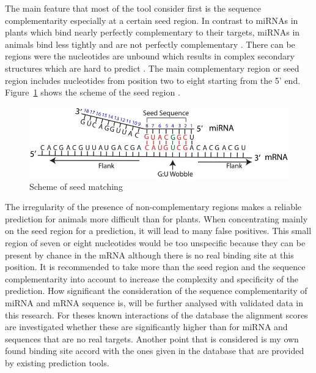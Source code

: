 \documentclass[12pt,  a4paper]{report}
\begin{document}
The main feature that most of the tool consider first is the sequence complementarity especially at a certain seed region. In contrast to miRNAs in plants which bind nearly perfectly complementary to their targets, miRNAs in animals bind less tightly and are not perfectly complementary \cite{Rhoades}. There can be regions were the nucleotides are unbound which results in complex secondary structures which are hard to predict \cite{Rehmsmeier}. The main complementary region or seed region includes nucleotides from position two to eight starting from the 5' end. Figure~\ref{seed} shows the scheme of the seed region \cite{Peterson}. \\


\begin{figure}[h]
\centering
\includegraphics[scale=2.8]{results/seedmatching.png} 
\caption{Scheme of seed matching}
\label{seed}
\end{figure}

The irregularity of the presence of non-complementary regions makes a reliable prediction for animals more difficult than for plants. When concentrating mainly on the seed region for a prediction, it will lead to many false positives. This small region of seven or eight nucleotides would be too unspecific because they can be present by chance in the mRNA although there is no real binding site at this position. It is recommended to take more than the seed region and the sequence complementarity into account to increase the complexity and specificity of the prediction. How significant the consideration of the sequence complementarity of miRNA and mRNA sequence is, will be further analysed with validated data in this research. For theses known interactions of the database the alignment scores are investigated whether these are significantly higher than for miRNA and sequences that are no real targets. Another point that is considered is my own found binding site accord with the ones given in the database that are provided by existing prediction tools. \\
\end{document}
